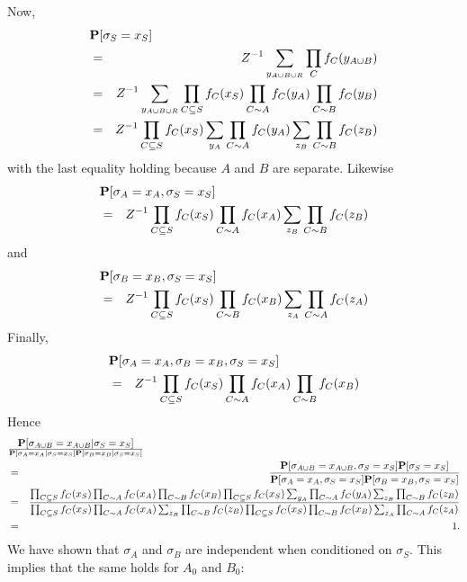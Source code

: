 \documentclass[11pt]{article} \usepackage{amssymb}
\begin{document}
Now,
\begin{eqnarray*}
  \lefteqn{\P[\sigma_S=x_S]}
\\ &=& Z^{-1}\sum_{y_{A\cup B\cup R}}\prod_Cf_C(y_{A\cup B})
\\ &=& Z^{-1}\sum_{y_{A\cup B\cup R}}\prod_{C\subseteq S}f_C(x_S)\prod_{C\sim A}f_C(y_A)\prod_{C\sim B}f_C(y_B)
\\ &=& Z^{-1}\prod_{C\subseteq S}f_C(x_S)\sum_{y_A}\prod_{C\sim A}f_C(y_A)\sum_{z_B}\prod_{C\sim B}f_C(z_B)
\end{eqnarray*}
with the last equality holding because $A$ and $B$ are separate. Likewise
\begin{eqnarray*}
  \lefteqn{\P[\sigma_A=x_A,\sigma_S=x_S]}
\\ &=& Z^{-1}\prod_{C\subseteq S}f_C(x_S)\prod_{C\sim A}f_C(x_A)\sum_{z_B}\prod_{C\sim B}f_C(z_B)
\end{eqnarray*}
and
\begin{eqnarray*}
  \lefteqn{\P[\sigma_B=x_B,\sigma_S=x_S]}
\\ &=& Z^{-1}\prod_{C\subseteq S}f_C(x_S)\prod_{C\sim B}f_C(x_B)\sum_{z_A}\prod_{C\sim A}f_C(z_A)
\end{eqnarray*}
Finally,
\begin{eqnarray*}
  \lefteqn{\P[\sigma_A=x_A,\sigma_B=x_B,\sigma_S=x_S]}
\\ &=& Z^{-1}\prod_{C\subseteq S}f_C(x_S)\prod_{C\sim A}f_C(x_A)\prod_{C\sim B}f_C(x_B)
\end{eqnarray*}
Hence
\begin{eqnarray*}
\lefteqn{\P[\sigma_{A\cup B}=x_{A\cup B}|\sigma_S=x_S]\over  
    \P[\sigma_A=x_A|\sigma_S=x_S]\P[\sigma_B=x_B|\sigma_S=x_S]}
\\  &=&   {\P[\sigma_{A\cup B}=x_{A\cup B},\sigma_S=x_S]\P[\sigma_S=x_S]\over  
    \P[\sigma_A=x_A,\sigma_S=x_S]\P[\sigma_B=x_B,\sigma_S=x_S]}
\\ &=& {
\prod_{C\subseteq S}f_C(x_S)\prod_{C\sim A}f_C(x_A)\prod_{C\sim B}f_C(x_B) \prod_{C\subseteq S}f_C(x_S)\sum_{y_A}\prod_{C\sim A}f_C(y_A)\sum_{z_B}\prod_{C\sim B}f_C(z_B)
  \over
\prod_{C\subseteq S}f_C(x_S)\prod_{C\sim A}f_C(x_A)\sum_{z_B}\prod_{C\sim B}f_C(z_B)\prod_{C\subseteq S}f_C(x_S)\prod_{C\sim B}f_C(x_B)\sum_{z_A}\prod_{C\sim A}f_C(z_A)
  }
\\ &=& 1.
\end{eqnarray*}
We have shown that $\sigma_A$ and $\sigma_B$ are independent when conditioned
on $\sigma_S$. This implies that the same holds for $A_0$ and $B_0$:
\end{document}
